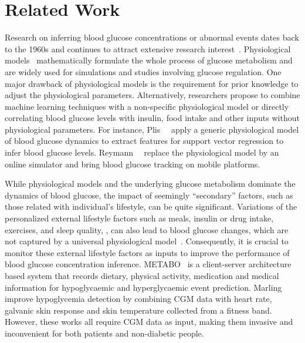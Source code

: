 \section{Related Work}
\label{sec:relwork}
Research on inferring blood glucose concentrations or abnormal events dates back to the 1960s and continues to attract extensive research interest~\cite{bib:IJNMBE16:Oviedo}.
Physiological models~\cite{bib:TBE07:Dalla, bib:PE04:Hovorka} mathematically formulate the whole process of glucose metabolism and are widely used for simulations and studies involving glucose regulation.
One major drawback of physiological models is the requirement for prior knowledge to adjust the physiological parameters.
Alternatively, researchers propose to combine machine learning techniques with a non-specific physiological model or directly correlating blood glucose levels with insulin, food intake and other inputs without physiological parameters.
For instance, Plis~\etal~\cite{bib:MAIHA14:Plis} apply a generic physiological model of blood glucose dynamics to extract features for support vector regression to infer blood glucose levels.
Reymann~\etal~\cite{bib:EMBC16:Reymann} replace the physiological model by an online simulator and bring blood glucose tracking on mobile platforms.

While physiological models and the underlying glucose metabolism dominate the dynamics of blood glucose, the impact of seemingly ``secondary'' factors, such as those related with individual's lifestyle, can be quite significant.
Variations of the personalized external lifestyle factors such as meals, insulin or drug intake, exercises, and sleep quality, \etc, can also lead to blood glucose changes, which are not captured by a universal physiological model~\cite{bib:DRCP15:Iwasaki}.
Consequently, it is crucial to monitor these external lifestyle factors as inputs to improve the performance of blood glucose concentration inference.
METABO~\cite{bib:EMBC09:Georga} is a client-server architecture based system that records dietary, physical activity, medication and medical information for hypoglycaemic and hyperglycaemic event prediction.
Marling~\etal~\cite{bib:KDHealth16:Marling} improve hypoglycemia detection by combining CGM data with heart rate, galvanic skin response and skin temperature collected from a fitness band.
However, these works all require CGM data as input, making them invasive and inconvenient for both patients and non-diabetic people.

